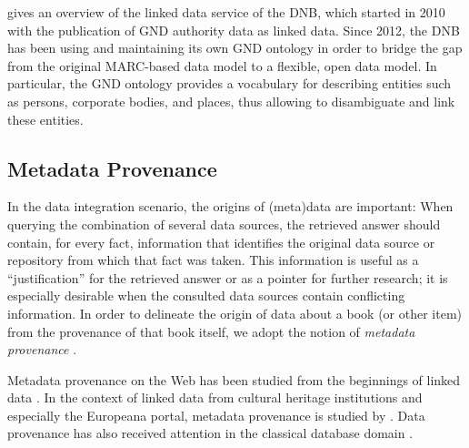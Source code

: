 \textcite{Hauser2014} gives an overview of the linked data service
of the \gls{DNB},
which started in 2010 with the publication of \gls{GND} authority data as linked data.
Since 2012, the \gls{DNB} has been using and maintaining its own \gls{GND} ontology \autocite{GNDOntology}
in order to bridge the gap from the original MARC-based data model to a flexible, open data model.
In particular, the \gls{GND} ontology provides a vocabulary for describing entities such as persons, corporate bodies, and places,
thus allowing to disambiguate and link these entities.

\subsection{Metadata Provenance}
\label{subsec:data_provenance}

In the data integration scenario, the origins of (meta)data are important:
When querying the combination of several data sources, the retrieved answer
should contain, for every fact, information that identifies the original data source or repository
from which that fact was taken.
This information is useful as a \enquote{justification} for the retrieved answer
or as a pointer for further research;
it is especially desirable when the consulted data sources contain conflicting information.
In order to delineate the origin of data about a book (or other item)
from the provenance of that book itself,
we adopt the notion of \emph{metadata provenance} \autocite{Eckert2012}.

Metadata provenance on the Web
has been studied
from the beginnings of linked data
\autocite[see, e.g.][]{Hartig2009,Moreau2008,Moreau2008a}.
In the context of linked data from cultural heritage institutions
and especially the Europeana portal,
metadata provenance is studied by
\citeauthor{Eckert2013} \autocite*{Eckert2013,Eckert2013a,Eckert2012}.
Data provenance has also received attention 
in the classical database domain
\autocite[see, e.g.,][§14]{Doan2012}.

